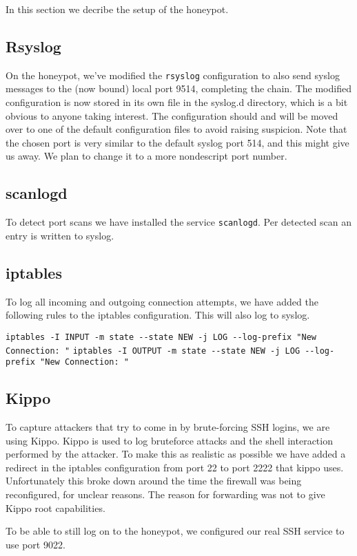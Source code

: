 \documentclass[11pt]{article} %
\begin{document}
In this section we decribe the setup of the honeypot.

\subsection{Rsyslog}
On the honeypot, we've modified the \verb|rsyslog| configuration to also send syslog messages to the (now bound) local port 9514, completing the chain.
The modified configuration is now stored in its own file in the syslog.d directory, which is a bit obvious to anyone taking interest.
The configuration should and will be moved over to one of the default configuration files to avoid raising suspicion.
Note that the chosen port is very similar to the default syslog port 514, and this might give us away.
We plan to change it to a more nondescript port number.

\subsection{scanlogd}
To detect port scans we have installed the service \verb|scanlogd|.
Per detected scan an entry is written to syslog.

\subsection{iptables}
To log all incoming and outgoing connection attempts, we have added the following rules to the iptables configuration. 
This will also log to syslog.

\verb|iptables -I INPUT -m state --state NEW -j LOG --log-prefix "New Connection: "|
\verb|iptables -I OUTPUT -m state --state NEW -j LOG --log-prefix "New Connection: "|

\subsection{Kippo}
To capture attackers that try to come in by brute-forcing SSH logins, we are using Kippo. 
Kippo is used to log bruteforce attacks and the shell interaction performed by the attacker. 
To make this as realistic as possible we have added a redirect in the iptables configuration from port 22 to port 2222 that kippo uses. 
Unfortunately this broke down around the time the firewall was being reconfigured, for unclear reasons. 
The reason for forwarding was not to give Kippo root capabilities.

To be able to still log on to the honeypot, we configured our real SSH service to use port 9022.
\end{document}
